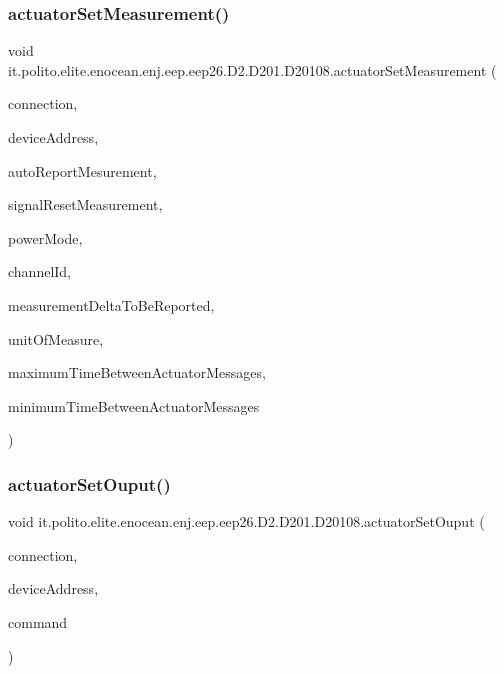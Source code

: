 \subsubsection{\texorpdfstring{actuator\+Set\+Measurement()}{actuatorSetMeasurement()}}
{\footnotesize\ttfamily void it.\+polito.\+elite.\+enocean.\+enj.\+eep.\+eep26.\+D2.\+D201.\+D20108.\+actuator\+Set\+Measurement (\begin{DoxyParamCaption}\item[{\hyperlink{classit_1_1polito_1_1elite_1_1enocean_1_1enj_1_1communication_1_1_en_j_connection}{En\+J\+Connection}}]{connection,  }\item[{byte \mbox{[}$\,$\mbox{]}}]{device\+Address,  }\item[{boolean}]{auto\+Report\+Mesurement,  }\item[{boolean}]{signal\+Reset\+Measurement,  }\item[{boolean}]{power\+Mode,  }\item[{int}]{channel\+Id,  }\item[{int}]{measurement\+Delta\+To\+Be\+Reported,  }\item[{\hyperlink{enumit_1_1polito_1_1elite_1_1enocean_1_1enj_1_1eep_1_1eep26_1_1_d2_1_1_d201_1_1_d201_unit_of_measure}{D201\+Unit\+Of\+Measure}}]{unit\+Of\+Measure,  }\item[{int}]{maximum\+Time\+Between\+Actuator\+Messages,  }\item[{int}]{minimum\+Time\+Between\+Actuator\+Messages }\end{DoxyParamCaption})}

\hypertarget{classit_1_1polito_1_1elite_1_1enocean_1_1enj_1_1eep_1_1eep26_1_1_d2_1_1_d201_1_1_d20108_a9c75e41d6232a6cfd6ce81e1e50e5168}{}\label{classit_1_1polito_1_1elite_1_1enocean_1_1enj_1_1eep_1_1eep26_1_1_d2_1_1_d201_1_1_d20108_a9c75e41d6232a6cfd6ce81e1e50e5168} 
\subsubsection{\texorpdfstring{actuator\+Set\+Ouput()}{actuatorSetOuput()}\hspace{0.1cm}{\footnotesize\ttfamily [1/2]}}
{\footnotesize\ttfamily void it.\+polito.\+elite.\+enocean.\+enj.\+eep.\+eep26.\+D2.\+D201.\+D20108.\+actuator\+Set\+Ouput (\begin{DoxyParamCaption}\item[{\hyperlink{classit_1_1polito_1_1elite_1_1enocean_1_1enj_1_1communication_1_1_en_j_connection}{En\+J\+Connection}}]{connection,  }\item[{byte \mbox{[}$\,$\mbox{]}}]{device\+Address,  }\item[{boolean}]{command }\end{DoxyParamCaption})}

